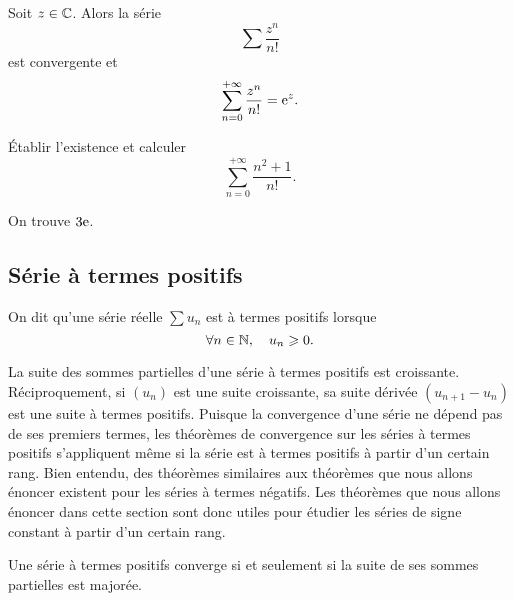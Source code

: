 \documentclass{magnolia}
\begin{document}

\begin{proposition}
Soit $z\in\mathbb{C}$. Alors la série
\[\sum \frac{z^n}{n!}\]
est convergente et
\[\sum_{n=0}^{+\infty} \frac{z^n}{n!}={\rm e}^z.\]
\end{proposition}

\begin{exoUnique}
\exo Établir l'existence et calculer
    \[\sum_{n=0}^{+\infty} \frac{n^2+1}{n!}.\]
\begin{sol}
On trouve $3{\rm e}$.
\end{sol}
\end{exoUnique}



\subsection{Série à termes positifs}

\begin{definition}
On dit qu'une série réelle $\sum u_n$ est à termes positifs lorsque
\[\forall n\in\mathbb{N},\quad u_n\geqslant 0.\]
\end{definition}

\begin{remarques}
\remarque La suite des sommes partielles d'une série à termes positifs est croissante.
  Réciproquement, si $(u_n)$ est une suite croissante, sa suite dérivée $(u_{n+1}-u_n)$ est
  une suite à termes positifs.
\remarque Puisque la convergence d'une série ne dépend pas de ses premiers termes, les
  théorèmes de convergence sur les séries à termes positifs s'appliquent même si la série
  est à termes positifs à partir d'un certain rang. Bien entendu, des théorèmes similaires
  aux théorèmes que nous allons énoncer existent pour les séries à termes négatifs.
  Les théorèmes que nous allons énoncer dans cette section sont donc utiles pour étudier
  les séries de signe constant à partir d'un certain rang.
\end{remarques}

\begin{proposition}
Une série à termes positifs converge si et seulement si la suite de ses sommes partielles
est majorée.
\end{proposition}
\end{document}
